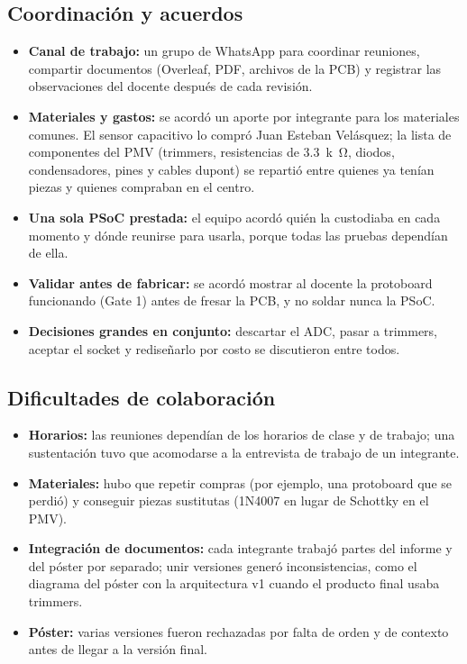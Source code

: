 \documentclass[11pt,a4paper]{article}
\begin{document}
\subsection{Coordinación y acuerdos}
\begin{itemize}
\item \textbf{Canal de trabajo:} un grupo de WhatsApp para coordinar reuniones, compartir documentos (Overleaf, PDF, archivos de la PCB) y registrar las observaciones del docente después de cada revisión.
\item \textbf{Materiales y gastos:} se acordó un aporte por integrante para los materiales comunes. El sensor capacitivo lo compró Juan Esteban Velásquez; la lista de componentes del PMV (trimmers, resistencias de \SI{3.3}{k\ohm}, diodos, condensadores, pines y cables dupont) se repartió entre quienes ya tenían piezas y quienes compraban en el centro.
\item \textbf{Una sola PSoC prestada:} el equipo acordó quién la custodiaba en cada momento y dónde reunirse para usarla, porque todas las pruebas dependían de ella.
\item \textbf{Validar antes de fabricar:} se acordó mostrar al docente la protoboard funcionando (Gate 1) antes de fresar la PCB, y no soldar nunca la PSoC.
\item \textbf{Decisiones grandes en conjunto:} descartar el ADC, pasar a trimmers, aceptar el socket y rediseñarlo por costo se discutieron entre todos.
\end{itemize}

\subsection{Dificultades de colaboración}
\begin{itemize}
\item \textbf{Horarios:} las reuniones dependían de los horarios de clase y de trabajo; una sustentación tuvo que acomodarse a la entrevista de trabajo de un integrante.
\item \textbf{Materiales:} hubo que repetir compras (por ejemplo, una protoboard que se perdió) y conseguir piezas sustitutas (1N4007 en lugar de Schottky en el PMV).
\item \textbf{Integración de documentos:} cada integrante trabajó partes del informe y del póster por separado; unir versiones generó inconsistencias, como el diagrama del póster con la arquitectura v1 cuando el producto final usaba trimmers.
\item \textbf{Póster:} varias versiones fueron rechazadas por falta de orden y de contexto antes de llegar a la versión final.
\end{itemize}
\end{document}
